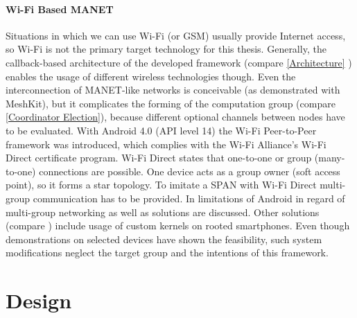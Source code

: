 \subsubsection{Wi-Fi Based \gls{MANET}}

Situations in which we can use Wi-Fi (or \gls{GSM}) usually provide Internet access, so Wi-Fi is not the primary target technology for this thesis. Generally, the callback-based architecture of the developed framework (compare \ref{Architecture} ) enables the usage of different wireless technologies though. Even the interconnection of \gls{MANET}-like networks is conceivable (as demonstrated with MeshKit), but it complicates the forming of the computation group (compare \ref{Coordinator Election}), because different optional channels between nodes have to be evaluated.
With Android 4.0 (\gls{API} level 14) the Wi-Fi Peer-to-Peer framework was introduced, which complies with the Wi-Fi Alliance's Wi-Fi Direct certificate program. Wi-Fi Direct states that one-to-one or group (many-to-one) connections are possible. One device acts as a group owner (soft access point), so it forms a star topology. To imitate a \gls{SPAN} with Wi-Fi Direct multi-group communication has to be provided. In \textcite{Funai2015} limitations of Android in regard of multi-group networking as well as solutions are discussed.
Other solutions (compare \textcite{Online:SPANProject}) include usage of custom kernels on rooted smartphones. Even though  demonstrations on selected devices have shown the feasibility, such system modifications neglect the target group and the intentions of this framework.





\FloatBarrier

\chapter{Design} \label{Design}

